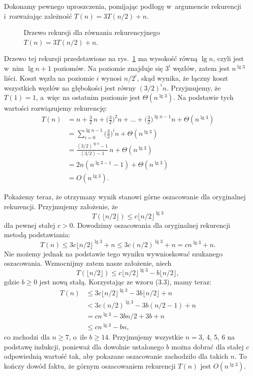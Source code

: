 
\exercise %
Dokonamy pewnego uproszczenia, pomijając podłogę w~argumencie rekurencji i~rozważając zależność $T(n)=3T(n/2)+n$.
\begin{figure}[ht]
	\centering 
	\caption{Drzewo rekursji dla równania rekurencyjnego $T(n)=3T(n/2)+n$.} \label{fig:4.2-1}
\end{figure}
Drzewo tej rekursji przedstawione na rys.\ \ref{fig:4.2-1} ma wysokość równą $\lg n$, czyli jest w~nim $\lg n+1$ poziomów.
Na  poziomie znajduje się $3^i$ węzłów, zatem jest $n^{\lg3}$ liści.
Koszt węzła na poziomie $i$ wynosi $n/2^i$, skąd wynika, że łączny koszt wszystkich węzłów na  głębokości jest równy $(3/2)^in$.
Przyjmujemy, że $T(1)=1$, a~więc na ostatnim poziomie jest $\Theta(n^{\lg3})$.
Na podstawie tych wartości rozwiązujemy rekurencję:
\begin{align*}
	T(n) &= n+\frac{3}{2}\,n+\biggl(\frac{3}{2}\biggr)^2n+\dots+\biggl(\frac{3}{2}\biggr)^{\lg n-1}n+\Theta(n^{\lg3}) \\
	&= \sum_{i=0}^{\lg n-1}\biggl(\frac{3}{2}\biggr)^in+\Theta(n^{\lg3}) \\
	&= \frac{(3/2)^{\lg n}-1}{(3/2)-1}\,n+\Theta(n^{\lg3}) \\[1mm]
	&= 2n(n^{\lg3-1}-1)+\Theta(n^{\lg3}) \\
	&= O(n^{\lg3}).
\end{align*}

Pokażemy teraz, że otrzymany wynik stanowi górne oszacowanie dla oryginalnej rekurencji.
Przyjmujemy założenie, że
\[
    T(\lfloor n/2\rfloor)\le c\lfloor n/2\rfloor^{\lg3}
\]
dla pewnej stałej $c>0$.
Dowodzimy oszacowania dla oryginalnej rekurencji metodą podstawiania:
\[
	T(n) \le 3c\lfloor n/2\rfloor^{\lg3}+n \le 3c(n/2)^{\lg3}+n = cn^{\lg3}+n.
\]
Nie możemy jednak na podstawie tego wyniku wywnioskować szukanego oszacowania.
Wzmocnijmy zatem nasze założenie, niech
\[
	T(\lfloor n/2\rfloor) \le c\lfloor n/2\rfloor^{\lg3}-b\lfloor n/2\rfloor,
\]
gdzie $b\ge0$ jest nową stałą.
Korzystając ze wzoru (3.3), mamy teraz:
\begin{align*}
	T(n) &\le 3c\lfloor n/2\rfloor^{\lg3}-3b\lfloor n/2\rfloor+n \\
	&< 3c(n/2)^{\lg3}-3b(n/2-1)+n \\
	&= cn^{\lg3}-3bn/2+3b+n \\
	&\le cn^{\lg3}-bn,
\end{align*}
co zachodzi dla $n\ge7$, o~ile $b\ge14$.
Przyjmujemy wszystkie $n=3$, 4, 5, 6 na podstawę indukcji, ponieważ dla dowolnie ustalonego $b$ można dobrać dla stałej $c$ odpowiednią wartość tak, aby pokazane oszacowanie zachodziło dla takich $n$.
To kończy dowód faktu, że górnym oszacowaniem rekurencji $T(n)$ jest $O(n^{\lg3})$.


